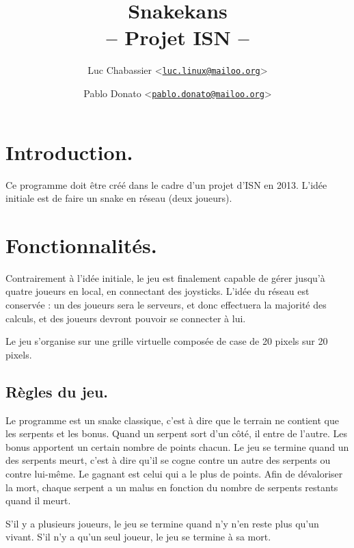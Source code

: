 \documentclass{article}
\title{Snakekans\\-- Projet ISN --}
\author{Luc Chabassier <\href{mailto:luc.linux@mailoo.org}{\nolinkurl{luc.linux@mailoo.org}}> \and Pablo Donato <\href{mailto:pablo.donato@mailoo.org}{\nolinkurl{pablo.donato@mailoo.org}}>}
\begin{document}
\maketitle

\tableofcontents

\section{Introduction.}
Ce programme doit être créé dans le cadre d'un projet d'ISN en 2013. L'idée initiale est de faire un snake en réseau (deux joueurs).

\section{Fonctionnalités.}
Contrairement à l'idée initiale, le jeu est finalement capable de gérer jusqu'à quatre joueurs en local, en connectant des joysticks. L'idée du réseau est conservée : un des joueurs sera le serveurs, et donc effectuera la majorité des calculs, et des joueurs devront pouvoir se connecter à lui.

Le jeu s'organise sur une grille virtuelle composée de case de 20 pixels sur 20 pixels.

\subsection{Règles du jeu.}
Le programme est un snake classique, c'est à dire que le terrain ne contient que les serpents et les bonus. Quand un serpent sort d'un côté, il entre de l'autre. Les bonus apportent un certain nombre de points chacun. Le jeu se termine quand un des serpents meurt, c'est à dire qu'il se cogne contre un autre des serpents ou contre lui-même. Le gagnant est celui qui a le plus de points. Afin de dévaloriser la mort, chaque serpent a un malus en fonction du nombre de serpents restants quand il meurt.

S'il y a plusieurs joueurs, le jeu se termine quand n'y n'en reste plus qu'un vivant. S'il n'y a qu'un seul joueur, le jeu se termine à sa mort.
\end{document}
